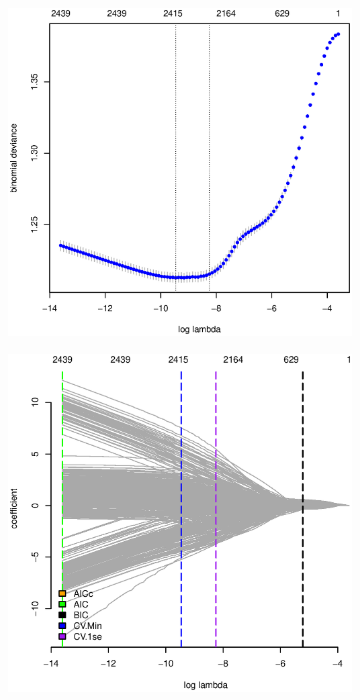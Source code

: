 \documentclass[11pt, fleqn]{article}
\begin{document}
\begin{figure}
  \centering
  \begin{subfigure}[b]{0.49\textwidth}
    \includegraphics[width=\textwidth]{pl_cv_nhl_gamlr_a.eps}
    \caption{}
  \end{subfigure}
  \hfill
  \begin{subfigure}[b]{0.49\textwidth}
    \includegraphics[width=\textwidth]{ic_pl_nhl_c.eps}
    \caption{}
  \end{subfigure}
  \caption{}
\end{figure}


\end{document}
